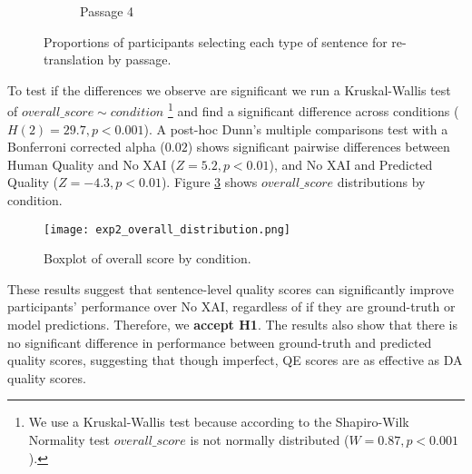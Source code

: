 \begin{figure}
\begin{subfigure}[t]{0.45\textwidth}
{\begin{bchart}[step=.25,max=1,width=\linewidth]
        \bcskip{6pt}
        
        
        \end{bchart}}
        \caption{Passage 4} 
        \label{fig:exp_p4_prop_answers}
    \end{subfigure}
    
    \caption{Proportions of participants selecting each type of sentence for re-translation by passage.}
    \label{fig:exp_prop_answers}

\end{figure}

To test if the differences we observe are significant we run a Kruskal-Wallis test of $overall\_score \sim condition$ \footnote{We use a Kruskal-Wallis test because according to the Shapiro-Wilk Normality test $overall\_score$ is not normally distributed ($W = 0.87, p < 0.001$).} and find a significant difference across conditions ($H(2) = 29.7, p < 0.001$). A post-hoc Dunn’s multiple comparisons test with a Bonferroni corrected alpha ($0.02$) shows significant pairwise differences between Human Quality and No XAI ($Z = 5.2, p < 0.01$), and No XAI and Predicted Quality ($Z = -4.3, p < 0.01$). Figure \ref{fig:exp_overall_distribution} shows $overall\_score$ distributions by condition. 

\begin{figure}[h!]
    \centering
    \texttt{[image: exp2\_overall\_distribution.png]}
    \caption{Boxplot of overall score by condition.}
    \label{fig:exp_overall_distribution}
\end{figure}

These results suggest that sentence-level quality scores can significantly improve participants’ performance over No XAI, regardless of if they are ground-truth or model predictions. Therefore, we \textbf{accept H1}. The results also show that there is no significant difference in performance between ground-truth and predicted quality scores, suggesting that though imperfect, QE scores are as effective as DA quality scores. 

